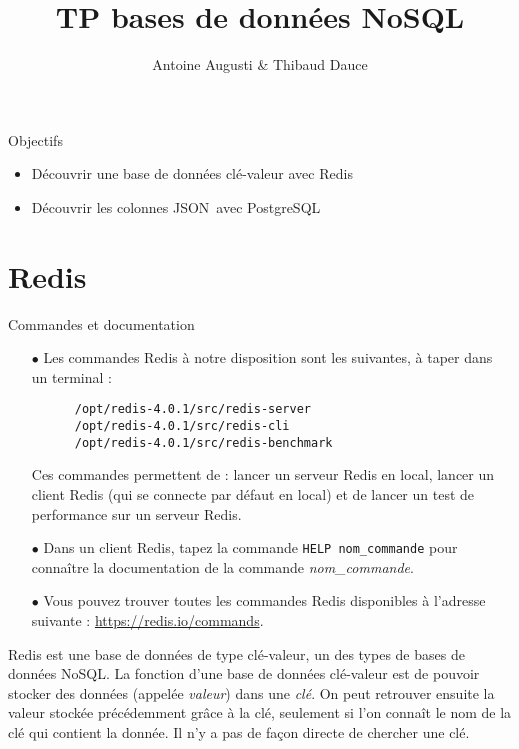 \documentclass[a4paper,10pt]{article}
\title{TP bases de données NoSQL}
\date{}
\author{Antoine Augusti \& Thibaud Dauce}
\begin{document}
\maketitle
\sloppy
\begin{bclogo}[logo = \bclampe, arrondi = 0.1, ombre = true, epOmbre = 0.2, couleurOmbre = black!30, couleurBord=bleuF, barre=none]{Objectifs}
  \begin{itemize}
   \item Découvrir une base de données clé-valeur avec Redis
   \item Découvrir les colonnes JSON avec PostgreSQL
  \end{itemize}
\end{bclogo}

\section{Redis}
  \begin{bclogo}[logo = \bctakecare, arrondi = 0.1, ombre = true , epOmbre = 0.1, couleurOmbre = black!30,  barre =none, couleurBarre=bleuF]{Commandes et documentation}
    \begin{itemize}
    \item[$\bullet$] Les commandes Redis à notre disposition sont les suivantes, à taper dans un terminal :
    \begin{verbatim}
      /opt/redis-4.0.1/src/redis-server
      /opt/redis-4.0.1/src/redis-cli
      /opt/redis-4.0.1/src/redis-benchmark
    \end{verbatim}
    \item[] Ces commandes permettent de : lancer un serveur Redis en local, lancer un client Redis (qui se connecte par défaut en local) et de lancer un test de performance sur un serveur Redis.
    \item[$\bullet$] Dans un client Redis, tapez la commande \texttt{HELP nom\_commande} pour connaître la documentation de la commande \textit{nom\_commande}.
    \item[$\bullet$] Vous pouvez trouver toutes les commandes Redis disponibles à l'adresse suivante : \url{https://redis.io/commands}.

   \end{itemize}
  \end{bclogo}

  Redis est une base de données de type clé-valeur, un des types de bases de données NoSQL. La fonction d'une base de données clé-valeur est de pouvoir stocker des données (appelée \textit{valeur}) dans une \textit{clé}. On peut retrouver ensuite la valeur stockée précédemment grâce à la clé, seulement si l'on connaît le nom de la clé qui contient la donnée. Il n'y a pas de façon directe de chercher une clé.\\
\end{document}
